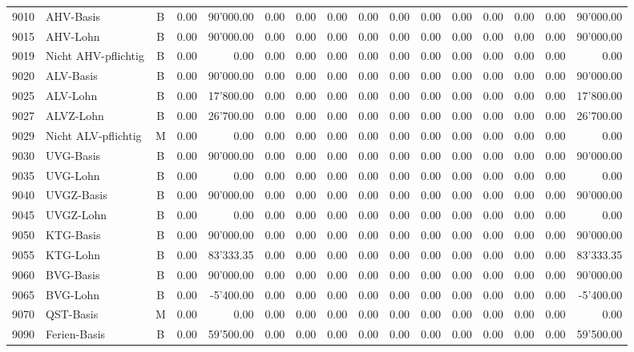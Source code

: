 \documentclass[8pt,a4paper]{extarticle}
\begin{document}
\begin{longtable}{@{\extracolsep{\fill}} l l c r r r r r r r r r r r r r}
9010&AHV-Basis&B&0.00&90'000.00&0.00&0.00&0.00&0.00&0.00&0.00&0.00&0.00&0.00&0.00&90'000.00\\
9015&AHV-Lohn&B&0.00&90'000.00&0.00&0.00&0.00&0.00&0.00&0.00&0.00&0.00&0.00&0.00&90'000.00\\
9019&Nicht AHV-pflichtig&B&0.00&0.00&0.00&0.00&0.00&0.00&0.00&0.00&0.00&0.00&0.00&0.00&0.00\\
9020&ALV-Basis&B&0.00&90'000.00&0.00&0.00&0.00&0.00&0.00&0.00&0.00&0.00&0.00&0.00&90'000.00\\
9025&ALV-Lohn&B&0.00&17'800.00&0.00&0.00&0.00&0.00&0.00&0.00&0.00&0.00&0.00&0.00&17'800.00\\
9027&ALVZ-Lohn&B&0.00&26'700.00&0.00&0.00&0.00&0.00&0.00&0.00&0.00&0.00&0.00&0.00&26'700.00\\
9029&Nicht ALV-pflichtig&M&0.00&0.00&0.00&0.00&0.00&0.00&0.00&0.00&0.00&0.00&0.00&0.00&0.00\\
9030&UVG-Basis&B&0.00&90'000.00&0.00&0.00&0.00&0.00&0.00&0.00&0.00&0.00&0.00&0.00&90'000.00\\
9035&UVG-Lohn&B&0.00&0.00&0.00&0.00&0.00&0.00&0.00&0.00&0.00&0.00&0.00&0.00&0.00\\
9040&UVGZ-Basis&B&0.00&90'000.00&0.00&0.00&0.00&0.00&0.00&0.00&0.00&0.00&0.00&0.00&90'000.00\\
9045&UVGZ-Lohn&B&0.00&0.00&0.00&0.00&0.00&0.00&0.00&0.00&0.00&0.00&0.00&0.00&0.00\\
9050&KTG-Basis&B&0.00&90'000.00&0.00&0.00&0.00&0.00&0.00&0.00&0.00&0.00&0.00&0.00&90'000.00\\
9055&KTG-Lohn&B&0.00&83'333.35&0.00&0.00&0.00&0.00&0.00&0.00&0.00&0.00&0.00&0.00&83'333.35\\
9060&BVG-Basis&B&0.00&90'000.00&0.00&0.00&0.00&0.00&0.00&0.00&0.00&0.00&0.00&0.00&90'000.00\\
9065&BVG-Lohn&B&0.00&-5'400.00&0.00&0.00&0.00&0.00&0.00&0.00&0.00&0.00&0.00&0.00&-5'400.00\\
9070&QST-Basis&M&0.00&0.00&0.00&0.00&0.00&0.00&0.00&0.00&0.00&0.00&0.00&0.00&0.00\\
9090&Ferien-Basis&B&0.00&59'500.00&0.00&0.00&0.00&0.00&0.00&0.00&0.00&0.00&0.00&0.00&59'500.00\\

\end{longtable}
\pagebreak
\end{document}
